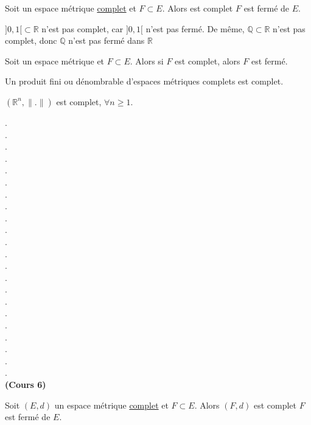 \documentclass[12pt,a4paper]{article}
\begin{document}
\begin{flushleft}
\begin{thm}
Soit \edm un espace métrique \underline{complet} et $F \subset E$. Alors \fdm est complet \ssi $F$ est fermé de $E$.
\end{thm}

\begin{rem} 
$]0,1[ \subset \mathbb{R}$ n'est pas complet, car $]0,1[$ n'est pas fermé. De même, $\mathbb {Q} \subset \mathbb{R}$ n'est pas complet, donc $\mathbb{Q}$ n'est pas fermé dans $\mathbb{R}$
\end{rem}


\begin{prop} 
Soit \edm un espace métrique et $F \subset E$. Alors si $F$ est complet, alors $F$ est fermé.
\end{prop}

\begin{thm}
Un produit fini ou dénombrable d'espaces métriques complets est complet.
\end{thm}

\begin{cor}
$( \mathbb{R}^n, \lVert . \rVert)$ est complet, $\forall n \geq 1$. 
\end{cor}







.\\
.\\
.\\
.\\
.\\
.\\
.\\
.\\
.\\
.\\
.\\
.\\
.\\
.\\
.\\
.\\
.\\
.\\
.\\
.\\
.\\
.\\
\textbf{(Cours 6)}


\begin{thm}
Soit $(E,d)$ un espace métrique \underline{complet} et $F \subset E$. Alors $(F,d)$ est complet \ssi $F$ est fermé de $E$.
\end{thm}



\end{flushleft}
\end{document}

